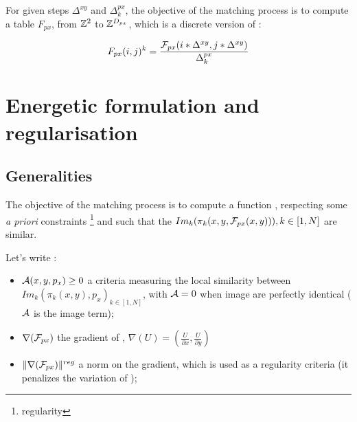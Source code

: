 For given steps $\Delta^{xy}$ and $\Delta^{px}_k$, the objective of
the matching process is to compute a table $F_{px}$, from $\ZZ^2$  to
$\ZZ^{\DimPx}$, which is a discrete version of \FPx:


\begin{equation}
   F_{px}(i,j)^k = \frac{\FPx(i*\Delta^{xy},j*\Delta^{xy})}{\Delta^{px}_k}
\end{equation}





\section{Energetic formulation and regularisation}

\subsection{Generalities}

\label{AM:Appr:Energ}


The objective of the matching process is to compute a function
\FPx , respecting some \emph{a priori} constraints \footnote{regularity}
and such that the $Im_k(\pi_k(x,y,\FPx(x,y))),k\in [1,N]$ are similar.



Let's write :

\begin{itemize}
     \item $\Ress(x,y,p_x) \geq 0$  a criteria measuring the
            local similarity between 
            $Im_k(\pi_k(x,y),p_x)_{k\in [1,N]}$, with $\Ress=0$
            when image are perfectly identical ($\Ress$ is the image term);

      \item $\nabla(\FPx)$ the gradient of \FPx, 
             $\nabla(U) = (\frac{U}{\partial x}, \frac{U}{\partial y})$

      \item $\| \nabla(\FPx) \|^{reg}$ a norm on the gradient, which is used as
            a regularity criteria (it penalizes the variation of \FPx);
\end{itemize}


